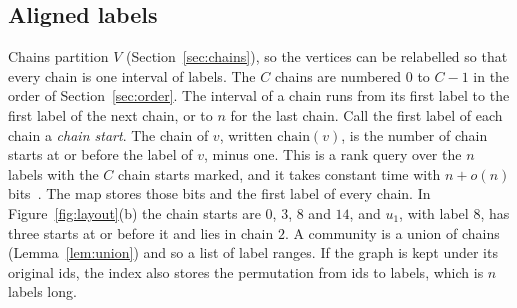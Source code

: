 \subsection{Aligned labels}\label{sec:labels}
Chains partition $V$ (Section~\ref{sec:chains}), so the vertices can be relabelled so that every chain is one interval of labels.
%
The $C$ chains are numbered $0$ to $C-1$ in the order of Section~\ref{sec:order}.
%
The interval of a chain runs from its first label to the first label of the next chain, or to $n$ for the last chain.
%
Call the first label of each chain a \textit{chain start}.
%
The chain of $v$, written $\mathrm{chain}(v)$, is the number of chain starts at or before the label of $v$, minus one.
%
This is a rank query over the $n$ labels with the $C$ chain starts marked, and it takes constant time with $n+o(n)$ bits~\cite{Jacobson1989}.
%
The map stores those bits and the first label of every chain.
%
In Figure~\ref{fig:layout}(b) the chain starts are $0$, $3$, $8$ and $14$, and $u_1$, with label $8$, has three starts at or before it and lies in chain $2$.
%
A community is a union of chains (Lemma~\ref{lem:union}) and so a list of label ranges.
%
If the graph is kept under its original ids, the index also stores the permutation from ids to labels, which is $n$ labels long.

